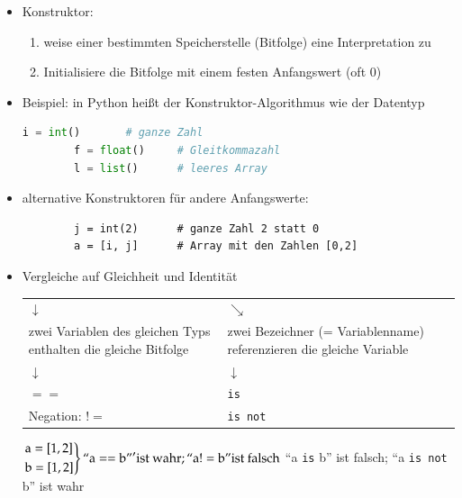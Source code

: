 \documentclass[11pt, fleqn]{scrreprt}
\begin{document}
\begin{itemize}[label={$\bullet$}]
	\item Konstruktor: 
	\begin{enumerate}
		\item weise einer bestimmten Speicherstelle (Bitfolge) eine Interpretation zu
		\item Initialisiere die Bitfolge mit einem festen Anfangswert (oft 0)
	\end{enumerate}
	\item[] Beispiel: in Python heißt der Konstruktor-Algorithmus wie der Datentyp \\
	\begin{lstlisting}[language=Python]
		i = int() 	 	# ganze Zahl
		f = float() 	# Gleitkommazahl
		l = list() 		# leeres Array
	\end{lstlisting}
	\item[] alternative Konstruktoren für andere Anfangswerte:
	\begin{lstlisting}
		j = int(2) 		# ganze Zahl 2 statt 0 
		a = [i, j] 		# Array mit den Zahlen [0,2]
	\end{lstlisting}
	
	\item Vergleiche auf Gleichheit und Identität \\
	\begin{tabular}{C{7cm} C{7cm}}
	$\downarrow$ & $\searrow$ \\
	zwei Variablen des gleichen Typs enthalten die gleiche Bitfolge & zwei Bezeichner (= Variablenname) referenzieren die gleiche Variable \\
	$\downarrow$ & $\downarrow$ \\
	$==$ & \verb|is| \\
	Negation: $!=$ & \verb|is not| \\
	\end{tabular}

	$\begin{rcases}
	\text{a} = [1,2] \\
	\text{b} = [1,2]
	\end{rcases}
	\text{``a} == \text{b''}' \text{ist wahr}; \text{``a} != \text{b''} \text{ist falsch} $ \hspace*{0.6cm}
	``a \verb|is|  b'' ist falsch; ``a \verb|is not| b'' ist wahr \\
	

\end{itemize}
\end{document}
